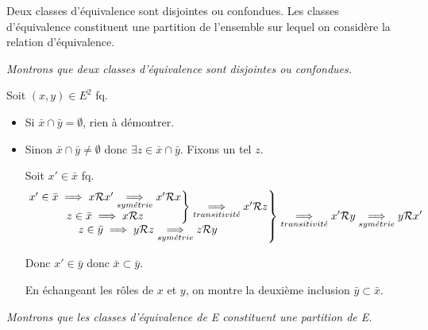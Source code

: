 \documentclass{article}
\begin{document}
	\begin{question_kholle}
		[\noindent Soit \Rel une relation d'équivalence sur $E$. \\
		Soit $x \in E$. \\
		La classe de $x$, notée $\bar{x}$, est l'ensemble des éléments de $E$ en relation avec x.
		\begin{equation}
			\bar{x} = \left\{ y \in E \;|\; x \Rel y \right\}
		\end{equation}]
		{Deux classes d'équivalence sont disjointes ou confondues. Les classes d'équivalence constituent une partition de l'ensemble sur lequel on considère la relation d'équivalence.}
		
		\textit{Montrons que deux classes d'équivalence sont disjointes ou confondues.}
		
		Soit $(x, y) \in E^2$ fq.
		\begin{itemize}[label=\textemdash]
			\item Si $\bar{x} \cap \bar{y} = \emptyset$, rien à démontrer.
			\item Sinon $\bar{x} \cap \bar{y} \neq \emptyset$ donc $\exists z \in \bar{x} \cap \bar{y}$. Fixons un tel $z$.

			Soit $x' \in \bar{x}$ fq.
			\begin{equation*}
				\left.
				\begin{matrix}
					\left. \begin{matrix}
						x' \in \bar{x} \implies x \mathcal R x' \underset{sym\acute{e}trie}{\implies} x' \mathcal R x \\
						z \in \bar{x} \implies x \mathcal R z
					\end{matrix}
					\right\} \underset{transitivit\acute{e}}{\implies} x' \mathcal R z \\
					z \in \bar{y} \implies y \mathcal R z \underset{sym\acute{e}trie}{\implies} z \mathcal R y
				\end{matrix}
				\right\} \underset{transitivit\acute{e}}{\implies} x' \mathcal R y
				\underset{sym\acute{e}trie}{\implies} y \mathcal R x'
			\end{equation*}
			
			Donc $x' \in \bar{y}$ donc $\bar{x} \subset \bar{y}$.
			
			En échangeant les rôles de $x$ et $y$, on montre la deuxième inclusion $\bar{y} \subset \bar{x}$.
		\end{itemize}
		\bigbreak
	
		\textit{Montrons que les classes d'équivalence de E constituent une partition de E.}
		

\end{question_kholle}
\end{document}
